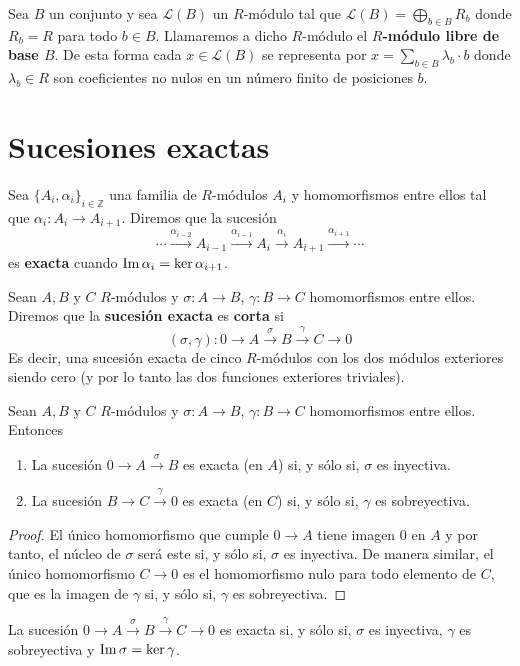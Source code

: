 \begin{definicion}
	Sea $B$ un conjunto y sea $\mathcal{L}(B)$ un $R$-módulo tal que $\mathcal{L}(B) = \bigoplus_{b \in B}R_b$ donde $R_b=R$ para todo $b \in B$. Llamaremos a dicho $R$-módulo el \textbf{$R$-módulo libre de base $B$}. De esta forma cada $x \in \mathcal{L}(B)$ se representa por $x = \sum_{b\in B}\lambda_b \cdot b$ donde $\lambda_b \in R$ son coeficientes no nulos en un número finito de posiciones $b$.
\end{definicion}

\section{Sucesiones exactas}

\begin{definicion}
	Sea $\{A_i, \alpha_i\}_{i \in \mathbb{Z}}$ una familia de $R$-módulos $A_i$ y homomorfismos entre ellos tal que $\alpha_i: A_i \rightarrow A_{i+1}$. Diremos que la sucesión
	\[ \cdots \xrightarrow{\alpha_{i-2}} A_{i-1} \xrightarrow{\alpha_{i-1}} A_i \xrightarrow{\alpha_{i}} A_{i+1} \xrightarrow{\alpha_{i+1}} \cdots \]
	es \textbf{exacta} cuando $\operatorname{Im} \alpha_i = \ker \alpha_{i+1}$.
\end{definicion}

\begin{definicion}
	Sean $A,B$ y $C$ $R$-módulos y $\sigma: A \rightarrow B$, $\gamma: B \rightarrow C$ homomorfismos entre ellos. Diremos que la \textbf{sucesión exacta} es \textbf{corta} si
	\[ (\sigma, \gamma): 0 \rightarrow A \xrightarrow{\sigma} B \xrightarrow{\gamma} C \rightarrow 0 \]
	Es decir, una sucesión exacta de cinco \(R\)-módulos con los dos módulos exteriores siendo cero (y por lo tanto las dos funciones exteriores triviales).
\end{definicion}

\begin{proposicion}
		Sean $A,B$ y $C$ $R$-módulos y $\sigma: A \rightarrow B$, $\gamma: B \rightarrow C$ homomorfismos entre ellos. Entonces
		\begin{enumerate}
			\item La sucesión $0 \to A \overset{\sigma}{\to} B$ es exacta (en $A$) si, y sólo si, $\sigma$ es inyectiva.
			\item La sucesión $B \to C \overset{\gamma}{\to} 0$ es exacta (en $C$) si, y sólo si, $\gamma$ es sobreyectiva.
		\end{enumerate}
\end{proposicion}
\begin{proof}
	El único homomorfismo que cumple $0 \to A$ tiene imagen $0$ en $A$ y por tanto, el núcleo de $\sigma$ será este si, y sólo si, $\sigma$ es inyectiva. De manera similar, el único homomorfismo $C \to 0$ es el homomorfismo nulo para todo elemento de $C$, que es la imagen de $\gamma$ si, y sólo si, $\gamma$ es sobreyectiva.
\end{proof}
\begin{corolario}
	La sucesión $0 \rightarrow A \xrightarrow{\sigma} B \xrightarrow{\gamma} C \rightarrow 0$ es exacta si, y sólo si, $\sigma$ es inyectiva, $\gamma$ es sobreyectiva y $\operatorname{Im} \sigma = \ker \gamma$.
\end{corolario}

